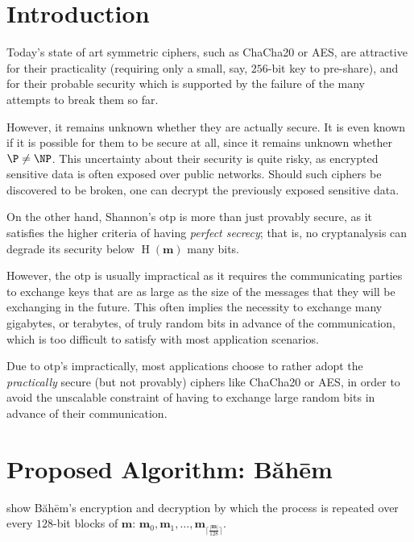 \documentclass[twocolumn,hidelinks]{article}
\newcommand{\baheem}{Băhēm}
\DeclareMathOperator{\entropy}{H}
\begin{document}
\tableofcontents

\section{Introduction}
Today's state of art symmetric ciphers, such as ChaCha20 or AES, are
attractive for their practicality (requiring only a small, say, $256$-bit
key to pre-share), and for their probable security which is supported by
the failure of the many attempts to break them so far.

However, it remains unknown whether they are actually secure.  It is even
known if it is possible for them to be secure at all, since it remains
unknown whether $\P \ne \NP$. This uncertainty about their security is
quite risky, as encrypted sensitive data is often exposed over public
networks.  Should such ciphers be discovered to be broken, one can decrypt
the previously exposed sensitive data.

On the other hand, Shannon's \gls{otp} is more than just provably secure,
as it satisfies the higher criteria of having \emph{perfect secrecy}; that
is, no cryptanalysis can degrade its security below $\entropy(\mathbf{m})$
many bits.

However, the \gls{otp} is usually impractical as it requires the
communicating parties to exchange keys that are as large as the size of the
messages that they will be exchanging in the future.  This often implies
the necessity to exchange many gigabytes, or terabytes, of truly random
bits in advance of the communication, which is too difficult to satisfy
with most application scenarios.

Due to \gls{otp}'s impractically, most applications choose to rather adopt
the \emph{practically} secure (but not provably) ciphers like ChaCha20 or
AES, in order to avoid the unscalable constraint of having to exchange
large random bits in advance of their communication.



\section{Proposed Algorithm: \baheem}
 show \baheem's encryption and decryption by which
the process is repeated over every $128$-bit blocks of $\mathbf{m}$:
$\mathbf{m}_0, \mathbf{m}_1, \ldots,
\mathbf{m}_{\lceil\frac{|\mathbf{m}|}{128}\rceil}$.
\end{document}
